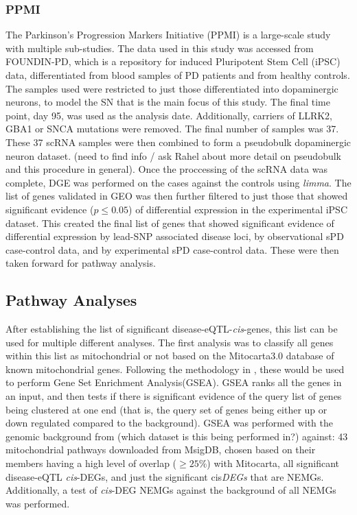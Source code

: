 \documentclass{article}
\begin{document}
\subsubsection{PPMI}
The Parkinson's Progression Markers Initiative (PPMI)\cite{Marek2011ThePPMI} is a large-scale study with multiple sub-studies. The data used in this study was accessed from FOUNDIN-PD\cite{Bressan2023TheMechanism}, which is a repository for induced Pluripotent Stem Cell (iPSC) data, differentiated from blood samples of PD patients and from healthy controls. The samples used were restricted to just those differentiated into dopaminergic neurons, to model the SN that is the main focus of this study. The final time point, day 95, was used as the analysis date. Additionally, carriers of LLRK2, GBA1 or SNCA mutations were removed. The final number of samples was 37. These 37 scRNA samples were then combined to form a pseudobulk dopaminergic neuron dataset. (need to find info / ask Rahel about more detail on pseudobulk and this procedure in general). Once the proccessing of the scRNA data was complete, DGE was performed on the cases against the controls using \textit{limma}\cite{Ritchie2015LimmaStudies}. The list of genes validated in GEO was then further filtered to just those that showed significant evidence ($p\leq0.05$) of differential expression in the experimental iPSC dataset. This created the final list of genes that showed significant evidence of differential expression by lead-SNP associated disease loci, by observational sPD case-control data, and by experimental sPD case-control data. These were then taken forward for pathway analysis.
\subsection{Pathway Analyses}
After establishing the list of significant disease-eQTL-\textit{cis}-genes, this list can be used for multiple different analyses. The first analysis was to classify all genes within this list as mitochondrial or not based on the Mitocarta3.0 database\cite{Rath2021MitoCarta3.0:Annotations} of known mitochondrial genes. Following the methodology in \cite{Maude2021NewDiabetes.}, these would be used to perform Gene Set Enrichment Analysis\cite{Subramanian2005GeneProfiles}(GSEA). GSEA ranks all the genes in an input, and then tests if there is significant evidence of the query list of genes being clustered at one end (that is, the query set of genes being either up or down regulated compared to the background). GSEA was performed with the genomic background from (which dataset is this being performed in?) against: 43 mitochondrial pathways downloaded from MsigDB\cite{Liberzon2011Molecular3.0}, chosen based on their members having a high level of overlap ($\geq25\%$) with Mitocarta\cite{Rath2021MitoCarta3.0:Annotations}, all significant disease-eQTL \textit{cis}-DEGs, and just the significant cis\textit{DEGs} that are NEMGs. Additionally, a test of \textit{cis}-DEG NEMGs against the background of all NEMGs was performed.
\end{document}
